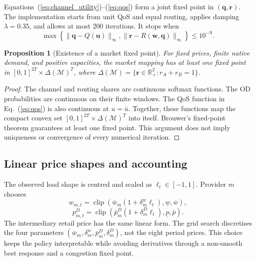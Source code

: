 \documentclass[11pt,a4paper]{article}
\newtheorem{proposition}{Proposition}
\newcommand{\M}{\mathcal{M}}
\begin{document}
Equations~(\ref{eq:channel_utility})--(\ref{eq:qos}) form a joint fixed point in $(\boldsymbol q,\boldsymbol r)$. The implementation starts from unit QoS and equal routing, applies damping $\lambda=0.35$, and allows at most 200 iterations. It stops when
\begin{equation}
\max\left\{\|\boldsymbol q-Q(\boldsymbol u)\|_\infty,
\|\boldsymbol r-R(\boldsymbol w,\boldsymbol q)\|_\infty\right\}\le 10^{-9}.
\label{eq:joint_residual}
\end{equation}

\begin{proposition}[Existence of a market fixed point]
For fixed prices, finite native demand, and positive capacities, the market mapping has at least one fixed point in $[0,1]^{2T}\times\Delta(\M)^T$, where $\Delta(\M)=\{\boldsymbol r\in\mathbb R_+^2:r_A+r_B=1\}$.
\end{proposition}
\begin{proof}
The channel and routing shares are continuous softmax functions. The OD probabilities are continuous on their finite windows. The QoS function in Eq.~(\ref{eq:qos}) is also continuous at $u=\bar u$. Together, these functions map the compact convex set $[0,1]^{2T}\times\Delta(\M)^T$ into itself. Brouwer's fixed-point theorem guarantees at least one fixed point. This argument does not imply uniqueness or convergence of every numerical iteration.
\end{proof}

\subsection{Linear price shapes and accounting}

The observed load shape is centred and scaled as $\ell_t\in[-1,1]$. Provider $m$ chooses
\begin{equation}
w_{m,t}=\operatorname{clip}\!\left(\bar w_m(1+\delta^w_m\ell_t),\underline w,\overline w\right),
\label{eq:wholesale_shape}
\end{equation}
\begin{equation}
p^D_{m,t}=\operatorname{clip}\!\left(\bar p^D_m(1+\delta^D_m\ell_t),\underline p,\overline p\right).
\label{eq:direct_shape}
\end{equation}
The intermediary retail price has the same linear form. The grid search discretises the four parameters $(\bar w_m,\delta^w_m,\bar p^D_m,\delta^D_m)$, not the eight period prices. This choice keeps the policy interpretable while avoiding derivatives through a non-smooth best response and a congestion fixed point.
\end{document}
